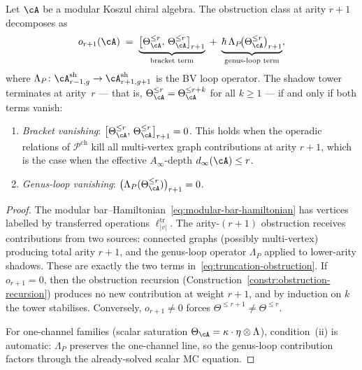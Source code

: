 \begin{lemma}
\label{lem:graph-sum-truncation}
\ClaimStatusProvedHere
{}
Let $\cA$ be a modular Koszul chiral algebra.
The obstruction class at arity $r{+}1$ decomposes as
\begin{equation}
\label{eq:truncation-obstruction}
o_{r+1}(\cA)
\;=\;
\underbrace{\bigl[\Theta_\cA^{\leq r},\,
\Theta_\cA^{\leq r}\bigr]_{r+1}}_{\text{bracket term}}
\;+\;
\underbrace{\hbar\,\Lambda_P\!\bigl(\Theta_\cA^{\leq r}
\bigr)_{r+1}}_{\text{genus-loop term}},
\end{equation}
where $\Lambda_P\colon \cA^{\mathrm{sh}}_{r-1,g} \to
\cA^{\mathrm{sh}}_{r+1,g+1}$ is the BV loop operator.
The shadow tower terminates at arity~$r$ --- that is,
$\Theta_\cA^{\leq r} = \Theta_\cA^{\leq r+k}$ for all
$k \geq 1$ --- if and only if both terms vanish:
\begin{enumerate}[label=\textup{(\roman*)}]
\item \emph{Bracket vanishing}:
  $\bigl[\Theta_\cA^{\leq r},\,
  \Theta_\cA^{\leq r}\bigr]_{r+1} = 0$.
  This holds when the operadic relations of
  $\mathcal{P}^{\mathrm{ch}}$ kill all multi-vertex
  graph contributions at arity $r{+}1$, which is
  the case when the effective $A_\infty$-depth
  $d_\infty(\cA) \leq r$.
\item \emph{Genus-loop vanishing}:
  $\bigl(\Lambda_P(\Theta_\cA^{\leq r})\bigr)_{r+1} = 0$.
\end{enumerate}
\end{lemma}

\begin{proof}
The modular bar--Hamiltonian~\eqref{eq:modular-bar-hamiltonian}
has vertices labelled by transferred operations
$\ell_{|v|}^{\mathrm{tr}}$.
The arity-$(r{+}1)$ obstruction receives
contributions from two sources: connected graphs (possibly
multi-vertex) producing total arity $r{+}1$, and the
genus-loop operator $\Lambda_P$ applied to lower-arity
shadows.  These are exactly the two terms
in~\eqref{eq:truncation-obstruction}.  If $o_{r+1} = 0$,
then the obstruction recursion
(Construction~\ref{constr:obstruction-recursion})
produces no new contribution at weight $r{+}1$, and
by induction on $k$ the tower stabilises.  Conversely,
$o_{r+1} \neq 0$ forces $\Theta^{\leq r+1} \neq
\Theta^{\leq r}$.

For one-channel families (scalar saturation
$\Theta_\cA = \kappa \cdot \eta \otimes \Lambda$),
condition~(ii) is automatic: $\Lambda_P$ preserves the
one-channel line, so the genus-loop contribution factors
through the already-solved scalar MC equation.
\end{proof}

